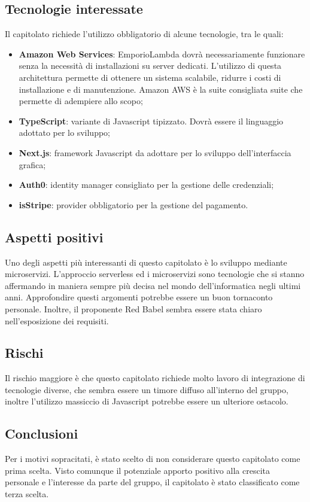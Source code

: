 \documentclass[../studio-di-fattibilita.tex]{subfiles}
\begin{document}
\subsection{Tecnologie interessate}%
\label{sub:c2_tecnologie_interessate}
Il capitolato richiede l’utilizzo obbligatorio di alcune tecnologie, tra le quali:
\begin{itemize}
  \item \textbf{Amazon Web Services}: EmporioLambda dovrà necessariamente funzionare senza la necessità di installazioni su server dedicati. L’utilizzo di questa architettura permette di ottenere un sistema scalabile, ridurre i costi di installazione e di manutenzione. Amazon AWS è la suite consigliata suite che permette di adempiere allo scopo;
  \item \textbf{TypeScript}: variante di Javascript tipizzato. Dovrà essere il linguaggio adottato per lo sviluppo;
  \item \textbf{Next.js}: framework Javascript da adottare per lo sviluppo dell’interfaccia grafica;
  \item \textbf{Auth0}: identity manager consigliato per la gestione delle credenziali;
  \item \textbf{isStripe}: provider obbligatorio per la gestione del pagamento.
\end{itemize}

\subsection{Aspetti positivi}%
\label{sub:c2_aspetti_positivi}
Uno degli aspetti più interessanti di questo capitolato è lo sviluppo mediante microservizi. L’approccio serverless ed i microservizi sono tecnologie che si stanno affermando in maniera sempre più decisa nel mondo dell’informatica negli ultimi anni. Approfondire questi argomenti potrebbe essere un buon tornaconto personale. Inoltre, il proponente Red Babel sembra essere stata chiaro nell’esposizione dei requisiti.

\subsection{Rischi}%
\label{sub:c2_rischi}
Il rischio maggiore è che questo capitolato richiede molto lavoro di integrazione di tecnologie diverse, che sembra essere un timore diffuso all’interno del gruppo, inoltre l’utilizzo massiccio di Javascript potrebbe essere un ulteriore ostacolo.

\subsection{Conclusioni}%
\label{sub:c2_conclusioni}
Per i motivi sopracitati, è stato scelto di non considerare questo capitolato come prima scelta. Visto comunque il potenziale apporto positivo alla crescita personale e l’interesse da parte del gruppo, il capitolato è stato classificato come terza scelta.
\end{document}
